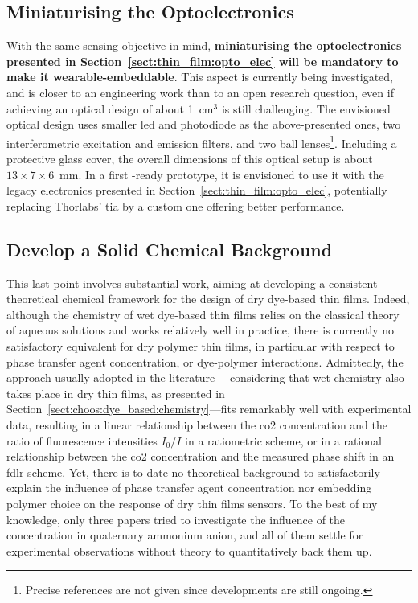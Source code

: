 \subsection{Miniaturising the Optoelectronics}\label{sect:conclusion:miniaturisation}

With the same \invivo{} sensing objective in mind, \textbf{miniaturising the optoelectronics presented in Section~\ref{sect:thin_film:opto_elec} will be mandatory to make it wearable-embeddable}. This aspect is currently being investigated, and is closer to an engineering work than to an open research question, even if achieving an optical design of about 1~cm$^3$ is still challenging. The envisioned optical design uses smaller \gls{led} and photodiode as the above-presented ones, two interferometric excitation and emission filters, and two ball lenses\footnote{Precise references are not given since developments are still ongoing.}. Including a protective glass cover, the overall dimensions of this optical setup is about $13\times7\times6$~mm. In a first \invivo{}-ready prototype, it is envisioned to use it with the legacy electronics presented in Section~\ref{sect:thin_film:opto_elec}, potentially replacing Thorlabs' \gls{tia} by a custom one offering better performance.

\subsection{Develop a Solid Chemical Background}\label{subsect:conclusion:solid_chemistry}

This last point involves substantial work, aiming at developing a consistent theoretical chemical framework for the design of dry dye-based thin films. Indeed, although the chemistry of wet dye-based thin films relies on the classical theory of aqueous solutions and works relatively well in practice\cite{vurek1983, he1995, degrandpre1999}, there is currently no satisfactory equivalent for dry polymer thin films, in particular with respect to phase transfer agent concentration, or dye-polymer interactions. Admittedly, the approach usually adopted in the literature---\ie{} considering that wet chemistry also takes place in dry thin films, as presented in Section~\ref{sect:choos:dye_based:chemistry}---fits remarkably well with experimental data, resulting in a linear relationship between the \gls{co2} concentration and the ratio of fluorescence intensities $I_0/I$ in a ratiometric scheme\cite{borisov2007, chu2008, chu2009}, or in a rational relationship between the \gls{co2} concentration and the measured phase shift in an \gls{fdlr} scheme\cite{burke2006, cajlakovic2009}. Yet, there is to date no theoretical background to satisfactorily explain the influence of phase transfer agent concentration nor embedding polymer choice on the response of dry thin films sensors. To the best of my knowledge, only three papers tried to investigate the influence of the concentration in quaternary ammonium anion\cite{malins1998, fernandezsanchez2007, fernandezramos2018}, and all of them settle for experimental observations without theory to quantitatively back them up.

